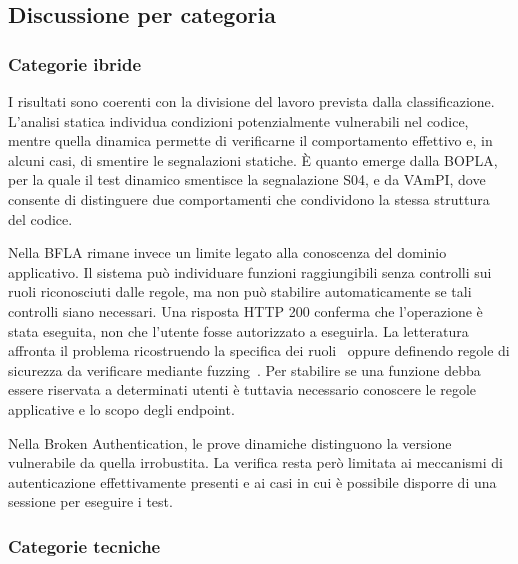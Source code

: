 \subsection{Discussione per categoria}
\label{sec:ris-categorie}

\subsubsection{Categorie ibride}
\label{sec:ris-ibride}

I risultati sono coerenti con la divisione del lavoro prevista dalla classificazione. L'analisi statica individua condizioni potenzialmente vulnerabili nel codice, mentre quella dinamica permette di verificarne il comportamento effettivo e, in alcuni casi, di smentire le segnalazioni statiche. È quanto emerge dalla BOPLA, per la quale il test dinamico smentisce la segnalazione S04, e da VAmPI, dove consente di distinguere due comportamenti che condividono la stessa struttura del codice.

Nella BFLA rimane invece un limite legato alla conoscenza del dominio applicativo. Il sistema può individuare funzioni raggiungibili senza controlli sui ruoli riconosciuti dalle regole, ma non può stabilire automaticamente se tali controlli siano necessari. Una risposta HTTP 200 conferma che l'operazione è stata eseguita, non che l'utente fosse autorizzato a eseguirla. La letteratura affronta il problema ricostruendo la specifica dei ruoli~\cite{sun2011static,son2011rolecast,monshizadeh2014mace} oppure definendo regole di sicurezza da verificare mediante fuzzing~\cite{atlidakis2020checking}. Per stabilire se una funzione debba essere riservata a determinati utenti è tuttavia necessario conoscere le regole applicative e lo scopo degli endpoint.

Nella Broken Authentication, le prove dinamiche distinguono la versione vulnerabile da quella irrobustita. La verifica resta però limitata ai meccanismi di autenticazione effettivamente presenti e ai casi in cui è possibile disporre di una sessione per eseguire i test.

\subsubsection{Categorie tecniche}
\label{sec:ris-statiche}

